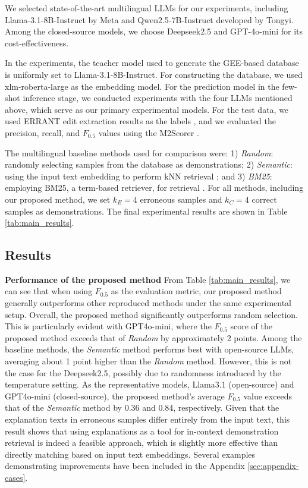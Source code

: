 We selected state-of-the-art multilingual LLMs for our experiments, including Llama-3.1-8B-Instruct by Meta \cite{dubey2024llama3} and Qwen2.5-7B-Instruct \cite{qwen2.5} developed by Tongyi. Among the closed-source models, we choose Deepseek2.5 \cite{deepseekv2} and GPT-4o-mini \cite{achiam2023gpt4-report} for its cost-effectiveness. 

In the experiments, the teacher model used to generate the GEE-based database is uniformly set to Llama-3.1-8B-Instruct. For constructing the database, we used xlm-roberta-large \cite{xlm_roberta} as the embedding model. For the prediction model in the few-shot inference stage, we conducted experiments with the four LLMs mentioned above, which serve as our primary experimental models. For the test data, we used ERRANT edit extraction results as the labels \cite{bryant-etal-2017-errant, zhang-etal-2022-mucgec}, and we evaluated the precision, recall, and $F_{0.5}$ values using the M2Scorer \cite{dahlmeier-ng-2012-m2scorer}.

The multilingual baseline methods used for comparison were: 1) \textit{Random}: randomly selecting samples from the database as demonstrations; 2) \textit{Semantic}: using the input text embedding to perform kNN retrieval \cite{khandelwal2020knnmt}; and 3) \textit{BM25}: employing BM25, a term-based retriever, for retrieval \cite{robertson2009probabilistic}. For all methods, including our proposed method, we set $k_E = 4$ erroneous samples and $k_C = 4$ correct samples as demonstrations. The final experimental results are shown in Table \ref{tab:main_results}.


\subsection{Results}




\noindent \textbf{Performance of the proposed method} \quad From Table \ref{tab:main_results}, we can see that when using $F_{0.5}$ as the evaluation metric, our proposed method generally outperforms other reproduced methods under the same experimental setup. Overall, the proposed method significantly outperforms random selection. This is particularly evident with GPT4o-mini, where the $F_{0.5}$ score of the proposed method exceeds that of \textit{Random} by approximately 2 points. Among the baseline methods, the \textit{Semantic} method performs best with open-source LLMs, averaging about 1 point higher than the \textit{Random} method. However, this is not the case for the Deepseek2.5, possibly due to randomness introduced by the temperature setting. As the representative models, Llama3.1 (open-source) and GPT4o-mini (closed-source), the proposed method's average $F_{0.5}$ value exceeds that of the \textit{Semantic} method by 0.36 and 0.84, respectively. Given that the explanation texts in erroneous samples differ entirely from the input text, this result shows that using explanations as a tool for in-context demonstration retrieval is indeed a feasible approach, which is slightly more effective than directly matching based on input text embeddings. Several examples demonstrating improvements have been included in the Appendix \ref{sec:appendix-cases}.

